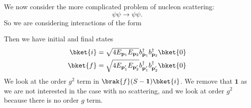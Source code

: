 \documentclass[a4paper]{article}
\begin{document}
\begin{eg}
  We now consider the more complicated problem of nucleon scattering:
  \[
    \psi \psi \to \psi \psi.
  \]
  So we are considering interactions of the form
  \begin{center}
  \end{center}
  Then we have initial and final states
  \begin{align*}
    \bket{i} &= \sqrt{4 E_{\mathbf{p}_1} E_{\mathbf{p}_2}} b_{\mathbf{p}_1}^\dagger b_{\mathbf{p}_2}^\dagger\bket{0}\\
    \bket{f} &= \sqrt{4 E_{\mathbf{p}_1'} E_{\mathbf{p}_2'}} b_{\mathbf{p}_1'}^\dagger b_{\mathbf{p}_2'}^\dagger\bket{0}
  \end{align*}
  We look at the order $g^2$ term in $\brak{f}(S - \mathbf{1})\bket{i}$. We remove that $\mathbf{1}$ as we are not interested in the case with no scattering, and we look at order $g^2$ because there is no order $g$ term.


\end{eg}
\end{document}
